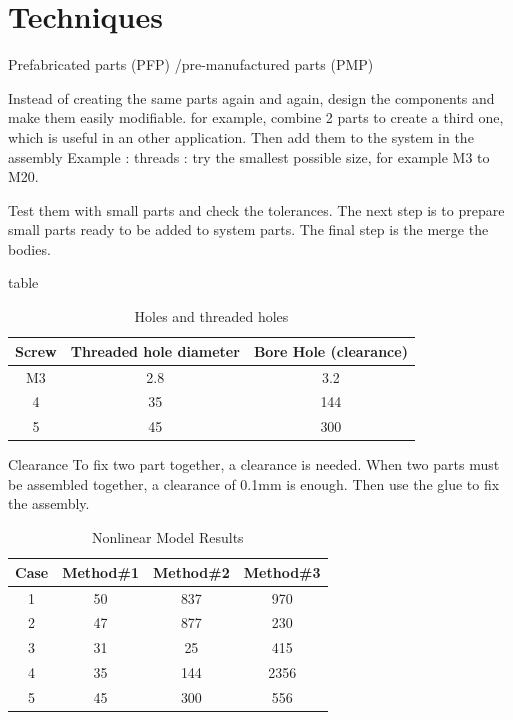 \documentclass[12pt,a4paper]{article}
\begin{document}
\newpage
\section{Techniques}
Prefabricated parts (PFP) /pre-manufactured parts (PMP)

Instead of creating the same parts again and again, design the components and make them easily modifiable.
for example, combine 2 parts to create a third one, which is useful in an other application. Then add them to the system in the assembly
Example : threads : try the smallest possible size, for example M3 to M20.

Test them with small parts and check the tolerances.
The next step is to prepare small parts ready to be added to system parts. The final step is the merge the bodies.


table

\begin{table}[ht]
    \caption{Holes and threaded holes} %
    \centering %
    \begin{tabular}{c c c} %
        \hline\hline %
        Screw & Threaded hole diameter & Bore Hole (clearance) \\ [0.5ex] %
        \hline %
        M3 & 2.8 & 3.2 \\ %
        4 & 35 & 144 \\
        5 & 45 & 300 \\ [1ex] %
        \hline %
    \end{tabular}\label{table:nonlin} %
\end{table}

Clearance
To fix two part together, a clearance is needed.
When two parts must be assembled together, a clearance of 0.1mm is enough. Then use the glue to fix the assembly.



\begin{table}[ht]
    \caption{Nonlinear Model Results} %
    \centering %
    \begin{tabular}{c c c c} %
        \hline\hline %
        Case & Method\#1 & Method\#2 & Method\#3 \\ [0.5ex] %
        \hline %
        1 & 50 & 837 & 970 \\ %
        2 & 47 & 877 & 230 \\
        3 & 31 & 25 & 415 \\
        4 & 35 & 144 & 2356 \\
        5 & 45 & 300 & 556 \\ [1ex] %
        \hline %
    \end{tabular}\label{table:nonlin} %
\end{table}
\end{document}
